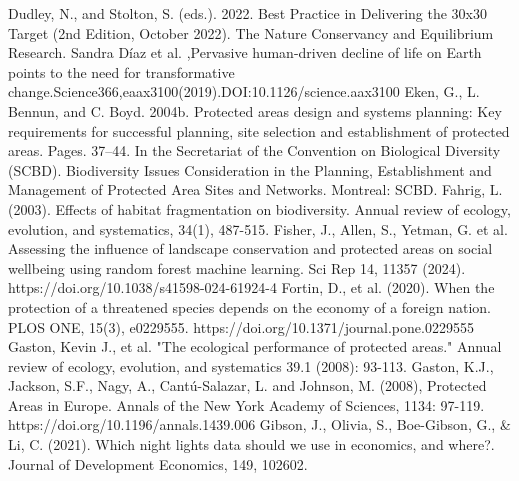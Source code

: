 \documentclass[12pt]{article}
\theoremstyle{break} %
\begin{document}
Dudley, N., and Stolton, S. (eds.). 2022. Best Practice in Delivering the 30x30 Target (2nd Edition, October 2022). The Nature Conservancy and Equilibrium Research.
\newline \newline
Sandra Díaz et al. ,Pervasive human-driven decline of life on Earth points to the need for transformative change.Science366,eaax3100(2019).DOI:10.1126/science.aax3100
\newline \newline
Eken, G., L. Bennun, and C. Boyd. 2004b. Protected areas design and systems planning: Key requirements for successful planning, site selection and establishment of protected areas. Pages. 37–44. In the Secretariat of the Convention on Biological Diversity (SCBD). Biodiversity Issues Consideration in the Planning, Establishment and Management of Protected Area Sites and Networks. Montreal: SCBD.
\newline \newline
Fahrig, L. (2003). Effects of habitat fragmentation on biodiversity. Annual review of ecology, evolution, and systematics, 34(1), 487-515.
\newline \newline
Fisher, J., Allen, S., Yetman, G. et al. Assessing the influence of landscape conservation and protected areas on social wellbeing using random forest machine learning. Sci Rep 14, 11357 (2024). https://doi.org/10.1038/s41598-024-61924-4
\newline \newline
Fortin, D., et al. (2020). When the protection of a threatened species depends on the economy of a foreign nation. PLOS ONE, 15(3), e0229555. https://doi.org/10.1371/journal.pone.0229555
\newline \newline
Gaston, Kevin J., et al. "The ecological performance of protected areas." Annual review of ecology, evolution, and systematics 39.1 (2008): 93-113.
\newline \newline
Gaston, K.J., Jackson, S.F., Nagy, A., Cantú-Salazar, L. and Johnson, M. (2008), Protected Areas in Europe. Annals of the New York Academy of Sciences, 1134: 97-119. https://doi.org/10.1196/annals.1439.006
\newline \newline
Gibson, J., Olivia, S., Boe-Gibson, G., \& Li, C. (2021). Which night lights data should we use in economics, and where?. Journal of Development Economics, 149, 102602.
\end{document}
